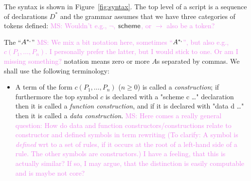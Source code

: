 \documentclass[letterpaper,11pt]{article}
\newcommand{\MS}[1]{\textcolor{violet}{MS: #1}}
\begin{document}
\begin{definition}
  The \hax syntax is shown in Figure~\ref{fig:syntax}. The top level of a \hax script is a sequence
  of declarations $D^*$ and the grammar assumes that we have three categories of tokens defined:
  \MS{Wouldn't e.g., $¬$, $\kw{scheme}$, or $→$ also be a token?}
  The ``$A^{*\kw,}$'' 
  \MS{We mix a bit notation here, sometimes ``$A^{*\kw,}$'', but also e.g., $c(P_1,…,P_n)$. I
    personally prefer the latter, but I would stick to one. Or am I missing something?}
  notation means zero or more $A$s separated by commas. We shall use the
  following terminology:
  \begin{itemize}

  \item A term of the form $c(P_1,…,P_n)$ ($n≥0$) is called a \emph{construction}; if furthermore
    the top symbol $c$ is declared with a "scheme c {…}" declaration then it is called a
    \emph{function construction}, and if it is declared with "data d {…}" then it is called a
    \emph{data construction}.
    \MS{Here comes a really general question: How do data and function constructors/constructions
      relate to constructor and defined symbols in term rewriting (To clarify: A symbol is
      \emph{defined} wrt to a set of rules, if it occurs at the root of a left-hand side of a
      rule. The other symbols are constructors.) I have a feeling, that this is actually similar? 
      If so, I may argue, that the distinction is easily computable and is maybe not core?
      }


\end{itemize}
\end{definition}
\end{document}
